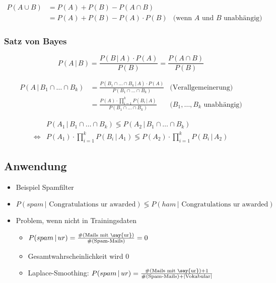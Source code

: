 \documentclass[nonacm=true, language=german]{acmart}
\begin{document}
\begin{align*}
    P(A \cup B) & = P(A) + P(B) - P(A \cap B) \\
                & = P(A) + P(B) - P(A) \cdot P(B)             & \text{(wenn $A$ und $B$ unabhängig)}
\end{align*}

\subsubsection{Satz von Bayes}

$$ P(A \, | \, B) = \frac{P(B \, | \, A) \cdot P(A)}{P(B)} = \frac{P(A \cap B)}{P(B)}  $$

\begin{align*}
    P(A \, | \, B_1 \cap \dots \cap B_k)    & = \frac{P(B_1 \cap \dots \cap B_k \, | \, A) \cdot P(A)}{P(B_1 \cap \dots \cap B_k)}          & \text{(Verallgemeinerung)} \\
                                            & = \frac{P(A) \cdot \displaystyle \prod_{i=1}^k P(B_i \, | \, A)}{P(B_1 \cap \dots \cap B_k)}  & \text{($B_1, \dots, B_k$ unabhängig)}
\end{align*}

\begin{align*}
                    & P(A_1 \, | \, B_1 \cap \dots \cap B_k) \lessgtr P(A_2 \, | \, B_1 \cap \dots \cap B_k) \\
    \Leftrightarrow & P(A_1) \cdot \displaystyle \prod_{i=1}^k P(B_i \, | \, A_1) \lessgtr P(A_2) \cdot \displaystyle \prod_{i=1}^k P(B_i \, | \, A_2)
\end{align*}

\subsection{Anwendung}

\begin{itemize}
    \item Beispiel Spamfilter
    \item $ P(spam \, | \text{ Congratulations ur awarded}) \lessgtr P(ham \, | \text{ Congratulations ur awarded}) $
    \item Problem, wenn  nicht in Trainingsdaten
    \begin{itemize}
        \item $ P(spam \, | \, ur) = \frac{\#(\text{Mails mit \say{ur}})}{\#(\text{Spam-Mails})} = 0$
        \item Gesamtwahrscheinlichkeit wird 0
        \item Laplace-Smoothing: $ P(spam \, | \, ur) = \frac{\#(\text{Mails mit \say{ur}}) + 1}{\#(\text{Spam-Mails}) + |\text{Vokabular}|} $
    \end{itemize}
\end{itemize}
\end{document}
